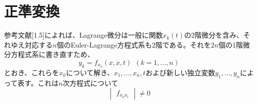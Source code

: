 \documentclass[dvipdfmx, leqno]{jsbook}
\begin{document}
\section{正準変換}
    参考文献[1.5]によれば、Lagrange微分は一般に関数$x_k(t)$の2階微分を含み、それゆえ対応する$n$個のEuler-Lagrange方程式系も2階である。それを$2n$個の1階微分方程式系に書き直すため、
\begin{equation} \label{eq:eq1.2.1}
    y_k= f_{\dot{x}_k}(x, \dot{x}, t)\ \ (k= 1, \ldots, n)
\end{equation}
    とおき、これらを$\dot{x}_k$について解き、$x_1, \ldots, x_n, t$および新しい独立変数$y_1, \ldots, y_n$によって表す。これは$n$次方程式について
\begin{equation}
    \begin{vmatrix}f_{\dot{x}_k\dot{x}_l}\end{vmatrix}\ne 0
\end{equation}
\end{document}
